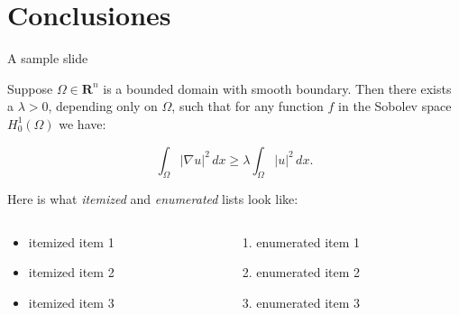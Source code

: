 \documentclass{beamer}
\begin{document}
\section{Conclusiones}
\begin{frame}{A sample slide}

\begin{theorem}
Suppose $\Omega\in\mathbf{R}^n$ is a bounded domain with smooth
boundary.  Then there exists a $\lambda>0$, depending only on
$\Omega$, such that for any function $f$ in the Sobolev space
$H^1_0(\Omega)$ we have:

\[
  \int_\Omega |\nabla u|^2 \,dx \ge 
  \lambda \int_\Omega |u|^2 \,dx .
\]
\end{theorem}

Here is what \emph{itemized} and \emph{enumerated} lists look like:

\begin{columns}
  \begin{column}{0.45\textwidth}
  \begin{itemize}
    \item itemized item 1
    \item itemized item 2
    \item itemized item 3
  \end{itemize}
  \end{column}

  \begin{column}{0.45\textwidth}
  \begin{enumerate}
    \item enumerated item 1
    \item enumerated item 2
    \item enumerated item 3
  \end{enumerate}
  \end{column}
\end{columns}

\end{frame}
\end{document}
